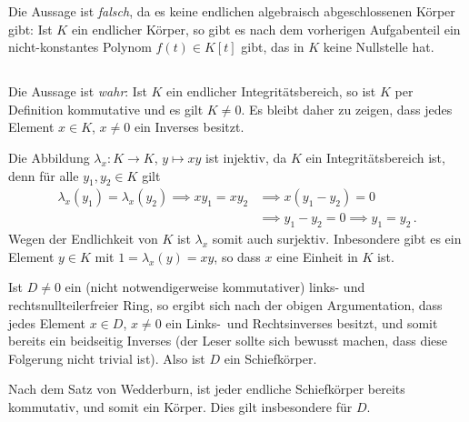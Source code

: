 Die Aussage ist \emph{falsch}, da es keine endlichen algebraisch abgeschlossenen Körper gibt:
Ist $K$ ein endlicher Körper, so gibt es nach dem vorherigen Aufgabenteil ein nicht-konstantes Polynom $f(t) \in K[t]$  gibt, das in $K$ keine Nullstelle hat.





\subsection{}

Die Aussage ist \emph{wahr}:
Ist $K$ ein endlicher Integritätsbereich, so ist $K$ per Definition kommutative und es gilt $K \neq 0$.
Es bleibt daher zu zeigen, dass jedes Element $x \in K$, $x \neq 0$ ein Inverses besitzt.

Die Abbildung $\lambda_x \colon K \to K$, $y \mapsto xy$ ist injektiv, da $K$ ein Integritätsbereich ist, denn für alle $y_1, y_2 \in K$ gilt
\begin{align*}
            \lambda_x(y_1) = \lambda_x(y_2)
   \implies x y_1 = x y_2
  &\implies x (y_1 - y_2) = 0 \\
  &\implies y_1 - y_2 = 0
   \implies y_1 = y_2 \,.
\end{align*}
Wegen der Endlichkeit von $K$ ist $\lambda_x$ somit auch surjektiv.
Inbesondere gibt es ein Element $y \in K$ mit $1 = \lambda_x(y) = xy$, so dass $x$ eine Einheit in $K$ ist.

\begin{remark}
  Ist $D \neq 0$ ein (nicht notwendigerweise kommutativer) links- und rechtsnullteilerfreier Ring, so ergibt sich nach der obigen Argumentation, dass jedes Element $x \in D$, $x \neq 0$ ein Links-\ und Rechtsinverses besitzt, und somit bereits ein beidseitig Inverses (der Leser sollte sich bewusst machen, dass diese Folgerung nicht trivial ist).
  Also ist $D$ ein Schiefkörper.
  
  Nach dem Satz von Wedderburn, ist jeder endliche Schiefkörper bereits kommutativ, und somit ein Körper.
  Dies gilt insbesondere für $D$.
\end{remark}






